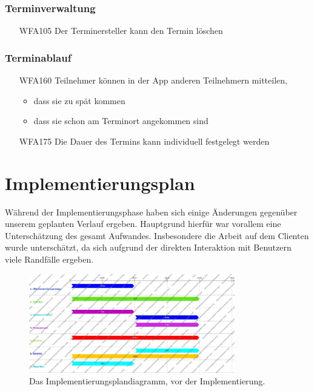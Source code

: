 \documentclass{scrartcl}
\begin{document}
	\subsubsection{Terminverwaltung}
	\begin{itemize}
		\item[WFA105] Der Terminersteller kann den Termin löschen	
	\end{itemize}

	\subsubsection{Terminablauf}
	\begin{itemize}
	\item[WFA160] Teilnehmer können in der App anderen Teilnehmern mitteilen,
		\begin{itemize}
			\item dass sie zu spät kommen
			\item dass sie schon am Terminort angekommen sind
		\end{itemize}
			\item[WFA175] Die Dauer des Termins kann individuell festgelegt werden
	\end{itemize}	

	
	\newpage
	\section{Implementierungsplan}
	Während der Implementierungsphase haben sich einige Änderungen gegenüber unserem geplanten Verlauf ergeben.
	Hauptgrund hierfür war vorallem eine Unterschätzung des gesamt Aufwandes. Insbesondere die Arbeit auf dem Clienten wurde unterschätzt, da sich aufgrund der direkten Interaktion mit Benutzern viele Randfälle ergeben.
	

	\begin{figure}[h]
		\centering
		\includegraphics[width=0.8\textwidth]{ImplementationPlanDiagram.jpg}
		\caption{Das Implementierungsplandiagramm, vor der Implementierung.}
	\end{figure}
\end{document}
